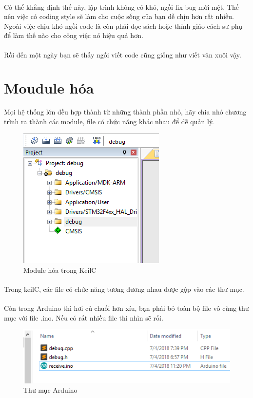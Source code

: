 \documentclass[12pt,a5paper]{book}
\begin{document}
\paragraph{}
Có thể khẳng định thế này, lập trình không có khó, ngồi fix bug mới mệt. Thế nên việc có coding style sẽ làm cho cuộc sống của bạn dễ chịu hơn rất nhiều. Ngoài việc chịu khó ngồi code là còn phải đọc sách hoặc thỉnh giáo cách sư phụ để làm thế nào cho công việc nó hiệu quả hơn.
\paragraph{}
Rồi đến một ngày bạn sẽ thấy ngồi viết code cũng giống như viết văn xuôi vậy.
\newpage
\section{Moudule hóa}
\paragraph{}
Mọi hệ thống lớn đều hợp thành từ những thành phần nhỏ, hãy chia nhỏ chương trình ra thành các module, file có chức năng khác nhau để dễ quản lý.
\begin{figure}[h!]
\centering
 \includegraphics[width=0.6\linewidth]{module.png}
 \caption{Module hóa trong KeilC}
\end{figure}
\paragraph{}
Trong keilC, các file có chức năng tương đương nhau được gộp vào các thư mục.

\paragraph{}
Còn trong Arduino thì hơi củ chuối hơn xíu, bạn phải bỏ toàn bộ file vô cùng thư mục với file .ino. Nếu có rất nhiều file thì nhìn sẽ rối.
\newpage 
\begin{figure}[h!]
\centering
 \includegraphics[width=1\linewidth]{arduino_folder.png}
 \caption{Thư mục Arduino}
\end{figure}
\end{document}
